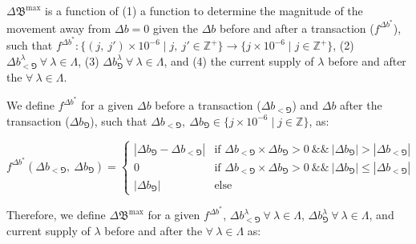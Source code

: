 \documentclass[class=article, crop=false]{standalone}
\begin{document}
\begin{enumerate}
    $\Delta \mathfrak{B}^\text{max}$ is a function of (1) a function to determine the magnitude of the movement away from $\Delta b = 0$ given the $\Delta b$ before and after a transaction ($f^{\Delta b^{*}}$), such that $f^{\Delta b^{*}}\colon \{(j,\ j') \times 10^{-6} \mid j,\ j' \in \mathbb{Z}^{+} \} \rightarrow \{j \times 10^{-6} \mid j \in \mathbb{Z}^{+} \}$, (2) $\Delta b_{<\Game}^{\lambda}\ \forall\ \lambda \in \Lambda$, (3) $\Delta b_{\Game}^{\lambda}\ \forall\ \lambda \in \Lambda$, and (4) the current supply of $\lambda$ before and after the  $\forall\ \lambda \in \Lambda$.

    We define $f^{\Delta b^{*}}$ for a given $\Delta b$ before a transaction ($\Delta b_{<\Game}$) and $\Delta b$ after the transaction ($\Delta b_{\Game}$), such that $\Delta b_{<\Game},\ \Delta b_{\Game} \in \{j \times 10^{-6} \mid j \in \mathbb{Z} \}$, as:

        $$
            f^{\Delta b^{*}}(\Delta b_{<\Game},\ \Delta b_{\Game}) =
                \begin{cases}
                    |\Delta b_{\Game} - \Delta b_{<\Game}| 
                        & \text{if } \Delta b_{<\Game} \times \Delta b_{\Game} > 0\ 
                    \text{\&\&}\ |\Delta b_{\Game}| > |\Delta b_{<\Game}| \\
                    
                    0 
                        & \text{if } \Delta b_{<\Game} \times \Delta b_{\Game} > 0\ 
                    \text{\&\&}\ |\Delta b_{\Game}| \leq |\Delta b_{<\Game}| \\
                    
                    |\Delta b_{\Game}| 
                        & \text{else }
            \end{cases}
        $$
    
    Therefore, we define $\Delta \mathfrak{B}^\text{max}$ for a given $f^{\Delta b^{*}}$, $\Delta b_{<\Game}^{\lambda}\ \forall\ \lambda \in \Lambda$, $\Delta b_{\Game}^{\lambda}\ \forall\ \lambda \in \Lambda$, and current supply of $\lambda$ before and after the  $\forall\ \lambda \in \Lambda$ as:


\end{enumerate}
\end{document}
